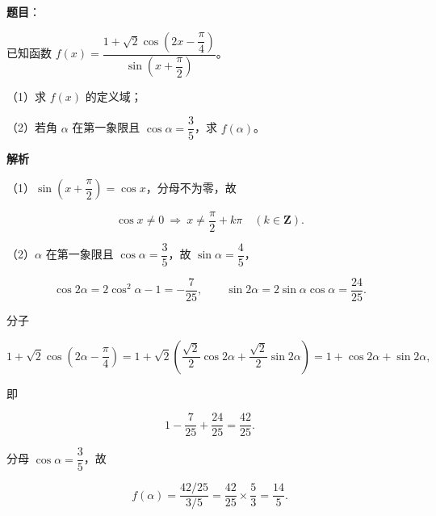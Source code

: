 \begin{answer}

\textbf{题目}：

已知函数 $f(x)=\dfrac{1+\sqrt2\cos\left(2x-\dfrac{\pi}{4}\right)}{\sin\left(x+\dfrac{\pi}{2}\right)}$。

（1）求 $f(x)$ 的定义域；

（2）若角 $\alpha$ 在第一象限且 $\cos\alpha=\dfrac35$，求 $f(\alpha)$。

\textbf{解析}

（1）$\sin\left(x+\dfrac{\pi}2\right)=\cos x$，分母不为零，故

\nopagebreak[4]
\[\cos x\neq0\ \Rightarrow\ x\neq\frac{\pi}2+k\pi\quad(k\in\mathbf Z).\]

（2）$\alpha$ 在第一象限且 $\cos\alpha=\dfrac35$，故 $\sin\alpha=\dfrac45$，

\nopagebreak[4]
\[\cos2\alpha=2\cos^2\alpha-1=-\frac7{25},\qquad \sin2\alpha=2\sin\alpha\cos\alpha=\frac{24}{25}.\]

分子

\nopagebreak[4]
\[1+\sqrt2\cos\left(2\alpha-\frac{\pi}4\right)=1+\sqrt2\left(\frac{\sqrt2}2\cos2\alpha+\frac{\sqrt2}2\sin2\alpha\right)=1+\cos2\alpha+\sin2\alpha,\]

即

\nopagebreak[4]
\[1-\frac7{25}+\frac{24}{25}=\frac{42}{25}.\]

分母 $\cos\alpha=\dfrac35$，故

\nopagebreak[4]
\[f(\alpha)=\frac{42/25}{3/5}=\frac{42}{25}\times\frac53=\frac{14}5.\]


\end{answer}
